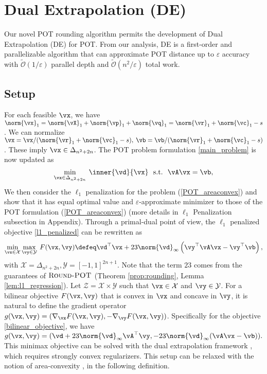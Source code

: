 \section{Dual Extrapolation (DE)}
Our novel POT rounding algorithm permits the development of Dual Extrapolation (DE) for POT. From our analysis, DE is a first-order and parallelizable algorithm that can approximate POT distance up to $\varepsilon$ accuracy with $\mathcal{\widetilde O}(1/\varepsilon)$ parallel depth and $\mathcal{\widetilde O}(n^2/\varepsilon)$ total work. 
\subsection{Setup}
For each feasible $\vx$, we have $\norm{\vx}_1 = \norm{\vX}_1 + \norm{\vp}_1 + \norm{\vq}_1 = \norm{\vr}_1 + \norm{\vc}_1 - s$. We can normalize $\vx = \vx / (\norm{\vr}_1 + \norm{\vc}_1 -s), \: \vb = \vb / (\norm{\vr}_1 + \norm{\vc}_1 -s)$. These imply $\vx \in \Delta_{n^2+2n}$. The POT problem formulation \eqref{main_problem} is now updated as
\begin{equation} \label{POT_areaconvex}
    \min_{\vx \in \Delta_{n^2+2n}} \:  \inner{\vd}{\vx} ~~ \text{s.t.} ~~ \vA\vx = \vb,
\end{equation}
We then consider the $\ell_1$ penalization for the problem (\ref{POT_areaconvex}) and show that it has equal optimal value and $\varepsilon$-approximate minimizer to those of the POT formulation (\ref{POT_areaconvex}) (more details in $\ell_1$ Penalization subsection in Appendix). Through a primal-dual point of view, the $\ell_1$ penalized objective \eqref{l1_penalized} can be rewritten as
\begin{equation} \label{bilinear_objective}
    \min_{\vx \in \mathcal{X}} \max_{\vy \in \mathcal{Y}} \: F(\vx,\vy) \defeq \vd^\top \vx + 23 \norm{\vd}_\infty \left( \vy^\top \vA \vx - \vy^\top \vb \right), 
\end{equation}
with $\mathcal{X} = \Delta_{n^2+2n}, \mathcal{Y} = [-1,1]^{2n+1}$. Note that the term $23$ comes from the guarantees of  $\textsc{Round-POT}$ (Theorem \ref{prop:rounding}, Lemma \ref{lem:l1_regression}). Let $\mathcal{Z} = \mathcal{X} \times \mathcal{Y}$ such that $\vx \in \mathcal{X}$ and $\vy \in \mathcal{Y}$. For a bilinear objective $F(\vx,\vy)$ that is convex in $\vx$ and concave in $\vy$, it is natural to define the gradient operator $g(\vx,\vy) = (\nabla_{\vx} F(\vx,\vy),- \nabla_{\vy} F(\vx,\vy))$. Specifically for the objective \eqref{bilinear_objective}, we have $g(\vx,\vy) = (\vd + 23 \norm{\vd}_\infty \vA^\top \vy, -23 \norm{\vd}_\infty (\vA \vx -\vb)).$  This minimax objective can be solved with the dual extrapolation framework \citep{nesterov_2006}, which requires strongly convex regularizers. This setup can be relaxed with the notion of area-convexity \citep[Definition 1.2]{Sherman-2017-Area}, in the following definition.
